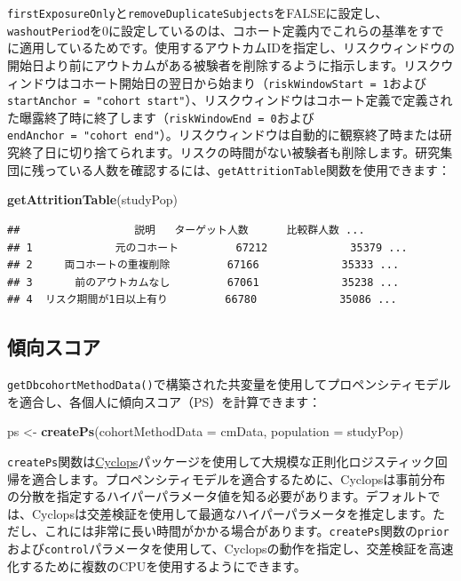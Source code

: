 \documentclass[
  11pt]{book}
\newenvironment{Shaded}{\begin{snugshade}}{\end{snugshade}}
\newcommand{\AttributeTok}[1]{\textcolor[rgb]{0.13,0.29,0.53}{#1}}
\newcommand{\FunctionTok}[1]{\textcolor[rgb]{0.13,0.29,0.53}{\textbf{#1}}}
\newcommand{\NormalTok}[1]{#1}
\newcommand{\OtherTok}[1]{\textcolor[rgb]{0.56,0.35,0.01}{#1}}
\theoremstyle{definition}
\theoremstyle{definition}
\theoremstyle{definition}
\theoremstyle{definition}
\theoremstyle{remark}
\begin{document}
\texttt{firstExposureOnly}と\texttt{removeDuplicateSubjects}をFALSEに設定し、\texttt{washoutPeriod}を0に設定しているのは、コホート定義内でこれらの基準をすでに適用しているためです。使用するアウトカムIDを指定し、リスクウィンドウの開始日より前にアウトカムがある被験者を削除するように指示します。リスクウィンドウはコホート開始日の翌日から始まり（\texttt{riskWindowStart\ =\ 1}および\texttt{startAnchor\ =\ "cohort\ start"}）、リスクウィンドウはコホート定義で定義された曝露終了時に終了します（\texttt{riskWindowEnd\ =\ 0}および\texttt{endAnchor\ =\ "cohort\ end"}）。リスクウィンドウは自動的に観察終了時または研究終了日に切り捨てられます。リスクの時間がない被験者も削除します。研究集団に残っている人数を確認するには、\texttt{getAttritionTable}関数を使用できます：

\begin{Shaded}
\begin{Highlighting}[]
\FunctionTok{getAttritionTable}\NormalTok{(studyPop)}
\end{Highlighting}
\end{Shaded}

\begin{verbatim}
##                  説明   ターゲット人数 　　　比較群人数 ...
## 1             元のコホート         67212             35379 ...
## 2     両コホートの重複削除         67166             35333 ...
## 3     　前のアウトカムなし         67061             35238 ...
## 4  リスク期間が1日以上有り         66780             35086 ...
\end{verbatim}

\subsection{傾向スコア}\label{ux50beux5411ux30b9ux30b3ux30a2-1}

\texttt{getDbcohortMethodData()}で構築された共変量を使用してプロペンシティモデルを適合し、各個人に傾向スコア（PS）を計算できます：

\begin{Shaded}
\begin{Highlighting}[]
\NormalTok{ps }\OtherTok{\textless{}{-}} \FunctionTok{createPs}\NormalTok{(}\AttributeTok{cohortMethodData =}\NormalTok{ cmData, }\AttributeTok{population =}\NormalTok{ studyPop)}
\end{Highlighting}
\end{Shaded}

\texttt{createPs}関数は\href{https://ohdsi.github.io/Cyclops/}{Cyclops}パッケージを使用して大規模な正則化ロジスティック回帰を適合します。プロペンシティモデルを適合するために、Cyclopsは事前分布の分散を指定するハイパーパラメータ値を知る必要があります。デフォルトでは、Cyclopsは交差検証を使用して最適なハイパーパラメータを推定します。ただし、これには非常に長い時間がかかる場合があります。\texttt{createPs}関数の\texttt{prior}および\texttt{control}パラメータを使用して、Cyclopsの動作を指定し、交差検証を高速化するために複数のCPUを使用するようにできます。
\end{document}
